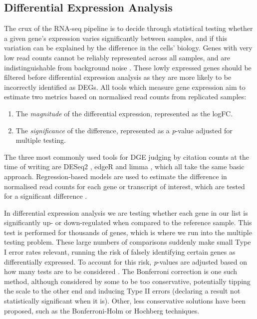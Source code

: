 \subsection{Differential Expression Analysis}
The crux of the RNA-seq pipeline is to decide through statistical testing whether a given gene's expression varies significantly between samples, and if this variation can be explained by the difference in the cells' biology. Genes with very low read counts cannot be reliably represented across all samples, and are indistinguishable from background noise \citep{mcintyre2011rna}. These lowly expressed genes should be filtered before differential expression analysis as they are more likely to be incorrectly identified as \ac{DEG}s. All tools which measure gene expression aim to estimate two metrics  based on normalised read counts from replicated samples: 

\begin{enumerate}\itemsep-0.5em
\item The \textit{magnitude} of the differential expression, represented as the \ac{logFC}.
\item The \textit{significance} of the difference, represented as a \textit{p}-value adjusted for multiple testing.
\end{enumerate} 

The three most commonly used tools for \ac{DGE} judging by citation counts at the time of writing are DESeq2 \citep{love2014moderated}, edgeR \citep{edger} and limma \citep{ritchie2015limma}, which all take the same basic approach. Regression-based models are used to estimate the difference in normalised read counts for each gene or transcript of interest, which are tested for a significant difference \citep{dundar2015introduction}.

In differential expression analysis we are testing whether each gene in our list is significantly up- or down-regulated when compared to the reference sample. This test is performed for thousands of genes, which is where we run into the multiple testing problem. These large numbers of comparisons suddenly make small Type I error rates relevant, running the risk of falsely identifying certain genes as differentially expressed. To account for this risk, \textit{p}-values are adjusted based on how many tests are to be considered \citep{feise2002multiple}. The Bonferroni correction \citep{dunn1961multiple} is one such method, although considered by some \citep{feise2002multiple} to be too conservative, potentially tipping the scale to the other end and inducing Type II errors (declaring a result not statistically significant when it is). Other, less conservative solutions have been proposed, such as the Bonferroni-Holm \citep{holm1979simple} or Hochberg \citep{hochberg1987multiple} techniques.

